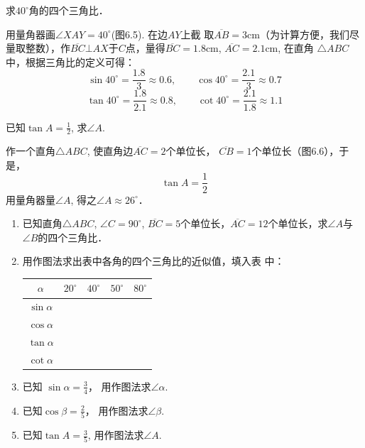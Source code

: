 \begin{example}
      求$40^{\circ}$角的四个三角比．
\end{example}

\begin{solution}
 用量角器画$\angle XAY=40^{\circ}$(图6.5). 在边$AY$上截
取$\overline{AB}=3$cm（为计算方便，我们尽量取整数），作$\overline{BC}\bot AX$于$C$点，量得$\overline{BC}=1.8$cm, $\overline{AC}=2.1$cm, 在直角
$\triangle ABC$中，根据三角比的定义可得：
\[\sin40^{\circ}=\frac{1.8}{3}\approx 0.6,\qquad \cos40^{\circ}=\frac{2.1}{3}\approx 0.7 \]
\[\tan40^{\circ}=\frac{1.8}{2.1}\approx 0.8,\qquad \cot40^{\circ}=\frac{2.1}{1.8}\approx 1.1\]
\end{solution}

\begin{example}
    已知$\tan A=\frac{1}{2}$, 求$\angle A$.
\end{example}

\begin{figure}[htp]
    \centering
{}
    \caption{}
\end{figure}

\begin{solution}
    作一个直角$\triangle ABC$, 使直角边$\overline{AC}=2$个单位长，
$\overline{CB}=1$个单位长（图6.6），于是，
\[\tan A=\frac{1}{2}\]
用量角器量$\angle A$, 得之$\angle A\approx 26^{\circ}$．
\end{solution}

\begin{ex}
\begin{enumerate}
    \item 已知直角$\triangle ABC$, $\angle C=90^{\circ}$, $\overline{BC}=5$个单位长，$\overline{AC}=
    12$个单位长，求$\angle A$与$\angle B$的四个三角比．
    \item 用作图法求出表中各角的四个三角比的近似值，填入表
    中：
\begin{center}
    \begin{tabular}{c|cccc}
\hline
        $\alpha$ & $20^{\circ}$ & $40^{\circ}$ & $50^{\circ}$ & $80^{\circ}$\\
\hline
$\sin\alpha$\\
$\cos\alpha$\\
$\tan\alpha$\\
$\cot\alpha$\\
\hline
    \end{tabular}
\end{center}
\item 已知 $\sin\alpha=\frac{3}{4}$，
用作图法求$\angle\alpha$.
\item 已知$\cos\beta=\frac{2}{5}$，
用作图法求$\angle \beta$.
\item 已知$\tan A=\frac{3}{5}$, 
用作图法求$\angle A$.
\end{enumerate}
\end{ex}

